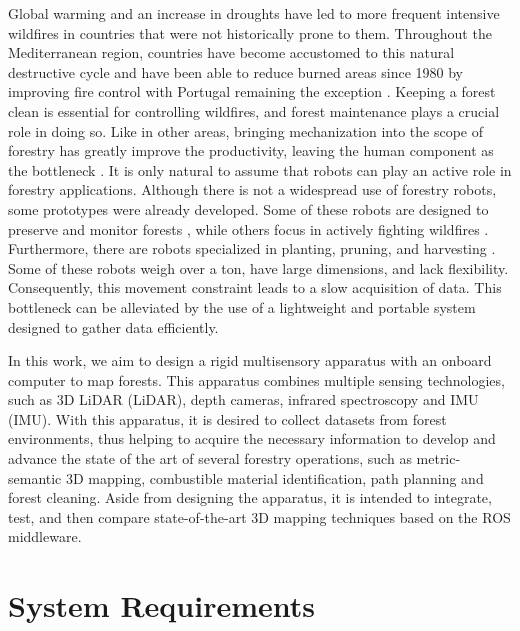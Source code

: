 Global warming and an increase in droughts have led to more frequent intensive wildfires in countries that were not historically prone to them. Throughout the Mediterranean region, countries have become accustomed to this natural destructive cycle and have been able to reduce burned areas since 1980 by improving fire control with Portugal remaining the exception \cite{turco_decreasing_2016, european_commission_joint_research_centre_forest_2021}. Keeping a forest clean is essential for controlling wildfires, and forest maintenance plays a crucial role in doing so. Like in other areas, bringing mechanization into the scope of forestry has greatly improve the productivity, leaving the human component as the bottleneck \cite{parker_robotics_2016}. It is only natural to assume that robots can play an active role in forestry applications. Although there is not a widespread use of forestry robots, some prototypes were already developed.  Some of these robots are designed to preserve and monitor forests \cite{couceiro_semfire_2019, jelavic_towards_2021, lam_flexible_2011, notomista_slothbot_2019}, while others focus in actively fighting wildfires \cite{noauthor_firefighting_2014, hose_cartridge, hydra}. Furthermore, there are robots specialized in planting, pruning, and harvesting \cite{noauthor_multiscope_nodate, molina_aerial_2017, zhang_rubber-tapping_2019}. Some of these robots weigh over a ton, have large dimensions, and lack flexibility. Consequently, this movement constraint leads to a slow acquisition of data. This bottleneck can be alleviated by the use of a lightweight and portable system designed to gather data efficiently.

In this work, we aim to design a rigid multisensory apparatus with an onboard computer to map forests. This apparatus combines multiple sensing technologies, such as 3D \acl{LiDAR} (\acs{LiDAR}), depth cameras, infrared spectroscopy and \acl{IMU} (\acs{IMU}). With this apparatus, it is desired to collect datasets from forest environments, thus helping to acquire the necessary information to develop and advance the state of the art of several forestry operations, such as metric-semantic 3D mapping, combustible material identification, path planning and forest cleaning. Aside from designing the apparatus, it is intended to integrate, test, and then compare state-of-the-art 3D mapping techniques based on the ROS middleware.

\section{System Requirements}

